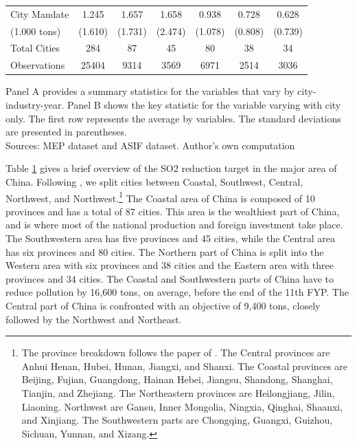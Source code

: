 \documentclass[12pt]{article}
\begin{document}
\begin{table}[htbp]
{\begin{threeparttable}
\begin{tabular}{l*{6}{c}}
    City Mandate &	1.245&	1.657&	1.658&	0.938&	0.728	&0.628\\
    (1.000 tons)&	(1.610)&	(1.731)&	(2.474)	&(1.078)	&(0.808)	&(0.739)\\
    \bottomrule
    
    Total Cities&	284&	87&	45&	80	&38	&34\\
    Observations &	25404&	9314&	3569&	6971&	2514&	3036\\
    \hline
  \end{tabular}
  \begin{tablenotes}
      \small
      \item Panel A provides a summary statistics for the variables that vary by city-industry-year. Panel B shows the key statistic for the variable varying with city only. The first row represents the average by variables. The standard deviations are presented in parentheses. \\
      Sources: MEP dataset and ASIF dataset. Author's own computation 
    \end{tablenotes}
\label{tab:table1}
\end{threeparttable}}
\end{table} 

Table \ref{tab:table1} gives a brief overview of the SO2 reduction target in the major area of China. Following \cite{Wu2017-bl}, we split cities between Coastal, Southwest, Central, Northwest, and Northwest.\footnote{The province breakdown follows the paper of \cite{Wu2017-bl}. The Central provinces are Anhui
Henan, Hubei, Hunan, Jiangxi, and Shanxi. The Coastal provinces are Beijing, Fujian, Guangdong, Hainan Hebei, Jiangsu, Shandong, Shanghai, Tianjin, and Zhejiang. The Northeastern provinces are Heilongjiang, Jilin, Liaoning. Northwest are Gansu, Inner Mongolia, Ningxia, Qinghai, Shaanxi, and Xinjiang. The Southwestern parts are Chongqing, Guangxi, Guizhou, Sichuan, Yunnan, and Xizang.} The Coastal area of China is composed of 10 provinces and has a total of 87 cities. This area is the wealthiest part of China, and is where most of the national production and foreign investment take place. The Southwestern area has five provinces and 45 cities, while the Central area has six provinces and 80 cities. The Northern part of China is split into the Western area with six provinces and 38 cities and the Eastern area with three provinces and 34 cities. The Coastal and Southwestern parts of China have to reduce pollution by 16,600 tons, on average, before the end of the 11th FYP. The Central part of China is confronted with an objective of 9,400 tons, closely followed by the Northwest and Northeast.
\end{document}
